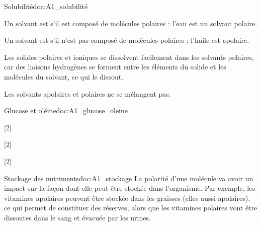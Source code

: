 \begin{doc}{Solubilité}{doc:A1_solubilité}
  \begin{listePoints}
    \item Un solvant est  s'il est composé de molécules polaires : l'eau est un solvant polaire.
    \item Un solvant est  s'il n'est pas composé de molécules polaires : l'huile est apolaire.
  \end{listePoints}
  Les solides polaires et ioniques se dissolvent facilement dans les solvants polaires, car des liaisons hydrogènes se forment entre les éléments du solide et les molécules du solvant, ce qui le dissout.

  Les solvants apolaires et polaires ne se mélangent pas.
\end{doc}

\begin{doc}{Glucose et oléine}{doc:A1_glucose_oleine}
\end{doc}

[2]

[2]

[2]


\begin{doc}{Stockage des nutriments}{doc:A1_stockage}
  La polarité d'une molécule va avoir un impact sur la façon dont elle peut être stockée dans l'organisme.
  Par exemple, les vitamines apolaires peuvent être stockée dans les graisses (elles aussi apolaires), ce qui permet de constituer des réserves, alors que les vitamines polaires vont être dissoutes dans le sang et évacuée par les urines.
\end{doc}